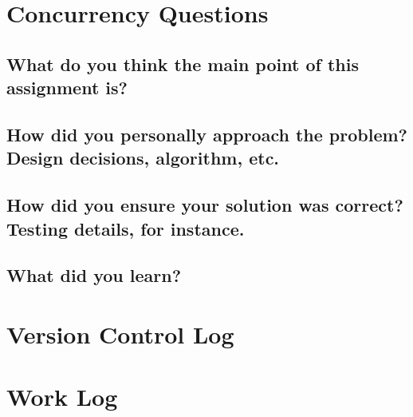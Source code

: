 \documentclass[letterpaper,10pt,titlepage]{article}
\begin{document}
\section{Concurrency Questions}

\subsection{What do you think the main point of this assignment is?}

\subsection{How did you personally approach the problem? Design decisions, algorithm, etc.}

\subsection{How did you ensure your solution was correct? Testing details, for instance.}

\subsection{What did you learn?}


\section{Version Control Log} 




\section{Work Log}
\end{document}
